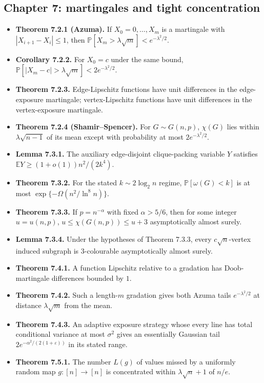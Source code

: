 \documentclass[10pt]{article}
\newcommand{\E}{\mathbb E}
\newcommand{\Prb}{\mathbb P}
\newcommand{\1}{\mathbf 1}
\begin{document}
\subsection*{Chapter 7: martingales and tight concentration}
\begin{itemize}
\item \textbf{Theorem 7.2.1 (Azuma).} If $X_0=0,\ldots,X_m$ is a martingale
with $|X_{i+1}-X_i|\leq1$, then
$\Prb[X_m>\lambda\sqrt m]<e^{-\lambda^2/2}$.
\item \textbf{Corollary 7.2.2.} For $X_0=c$ under the same bound,
$\Prb[|X_m-c|>\lambda\sqrt m]<2e^{-\lambda^2/2}$.
\item \textbf{Theorem 7.2.3.} Edge-Lipschitz functions have unit differences
in the edge-exposure martingale; vertex-Lipschitz functions have unit
differences in the vertex-exposure martingale.
\item \textbf{Theorem 7.2.4 (Shamir--Spencer).} For $G\sim G(n,p)$,
$\chi(G)$ lies within $\lambda\sqrt{n-1}$ of its mean except with probability
at most $2e^{-\lambda^2/2}$.
\item \textbf{Lemma 7.3.1.} The auxiliary edge-disjoint clique-packing variable
$Y$ satisfies $\E Y\geq(1+o(1))n^2/(2k^4)$.
\item \textbf{Theorem 7.3.2.} For the stated $k\sim2\log_2 n$ regime,
$\Prb[\omega(G)<k]$ is at most
$\exp\{-\Omega(n^2/\ln^8 n)\}$.
\item \textbf{Theorem 7.3.3.} If $p=n^{-\alpha}$ with fixed
$\alpha>5/6$, then for some integer $u=u(n,p)$,
$u\leq\chi(G(n,p))\leq u+3$ asymptotically almost surely.
\item \textbf{Lemma 7.3.4.} Under the hypotheses of Theorem 7.3.3, every
$c\sqrt n$-vertex induced subgraph is $3$-colourable asymptotically almost
surely.
\item \textbf{Theorem 7.4.1.} A function Lipschitz relative to a gradation has
Doob-martingale differences bounded by $1$.
\item \textbf{Theorem 7.4.2.} Such a length-$m$ gradation gives both Azuma
tails $e^{-\lambda^2/2}$ at distance $\lambda\sqrt m$ from the mean.
\item \textbf{Theorem 7.4.3.} An adaptive exposure strategy whose every line
has total conditional variance at most $\sigma^2$ gives an essentially Gaussian
tail $2e^{-\alpha^2/(2(1+\varepsilon))}$ in its stated range.
\item \textbf{Theorem 7.5.1.} The number $L(g)$ of values missed by a uniformly
random map $g:[n]\to[n]$ is concentrated within $\lambda\sqrt n+1$ of $n/e$.

\end{itemize}
\end{document}
